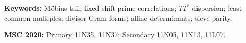 \documentclass[11pt]{article}
\theoremstyle{definition}
\theoremstyle{remark}
\begin{document}
\noindent\textbf{Keywords:} M\"obius tail; fixed-shift prime
correlations; $TT^*$ dispersion; least common multiples; divisor Gram
forms; affine determinants; sieve parity.

\medskip
\noindent\textbf{MSC 2020:} Primary 11N35, 11N37; Secondary
11N05, 11N13, 11L07.














\end{document}
